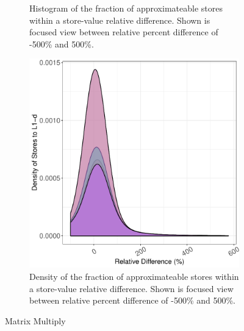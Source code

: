 \begin{figure}[htbp]
\begin{subfigure}{0.33\textwidth}
		\caption{Histogram of the fraction of approximateable stores within a store-value relative difference. Shown is focused view between relative percent difference of -500\% and 500\%.}
	\end{subfigure}
	\begin{subfigure}{0.33\textwidth}
		\centering
		\includegraphics[scale=0.4]{graphs/matrix_multiply/narrow_dist.pdf}
		\caption{Density of the fraction of approximateable stores within a store-value relative difference. Shown is focused view between relative percent difference of -500\% and 500\%.}
	\end{subfigure}
\caption{Matrix Multiply} %
\label{fig:matrix_multiply_valsim}
\end{figure}

